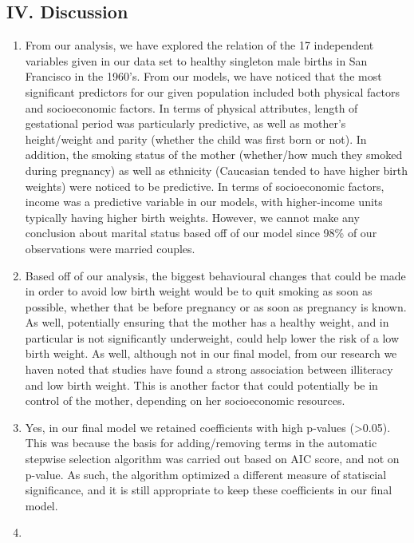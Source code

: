 \documentclass[]{article}
\begin{document}
\subsection{IV. Discussion}\label{iv.-discussion}

\begin{enumerate}
\def\labelenumi{\arabic{enumi}.}
\item
  From our analysis, we have explored the relation of the 17 independent
  variables given in our data set to healthy singleton male births in
  San Francisco in the 1960's. From our models, we have noticed that the
  most significant predictors for our given population included both
  physical factors and socioeconomic factors. In terms of physical
  attributes, length of gestational period was particularly predictive,
  as well as mother's height/weight and parity (whether the child was
  first born or not). In addition, the smoking status of the mother
  (whether/how much they smoked during pregnancy) as well as ethnicity
  (Caucasian tended to have higher birth weights) were noticed to be
  predictive. In terms of socioeconomic factors, income was a predictive
  variable in our models, with higher-income units typically having
  higher birth weights. However, we cannot make any conclusion about
  marital status based off of our model since 98\% of our observations
  were married couples.
\item
  Based off of our analysis, the biggest behavioural changes that could
  be made in order to avoid low birth weight would be to quit smoking as
  soon as possible, whether that be before pregnancy or as soon as
  pregnancy is known. As well, potentially ensuring that the mother has
  a healthy weight, and in particular is not significantly underweight,
  could help lower the risk of a low birth weight. As well, although not
  in our final model, from our research we haven noted that studies have
  found a strong association between illiteracy and low birth weight.
  This is another factor that could potentially be in control of the
  mother, depending on her socioeconomic resources.
\item
  Yes, in our final model we retained coefficients with high p-values
  (\textgreater{}0.05). This was because the basis for adding/removing
  terms in the automatic stepwise selection algorithm was carried out
  based on AIC score, and not on p-value. As such, the algorithm
  optimized a different measure of statiscial significance, and it is
  still appropriate to keep these coefficients in our final model.
\item

\end{enumerate}
\end{document}
